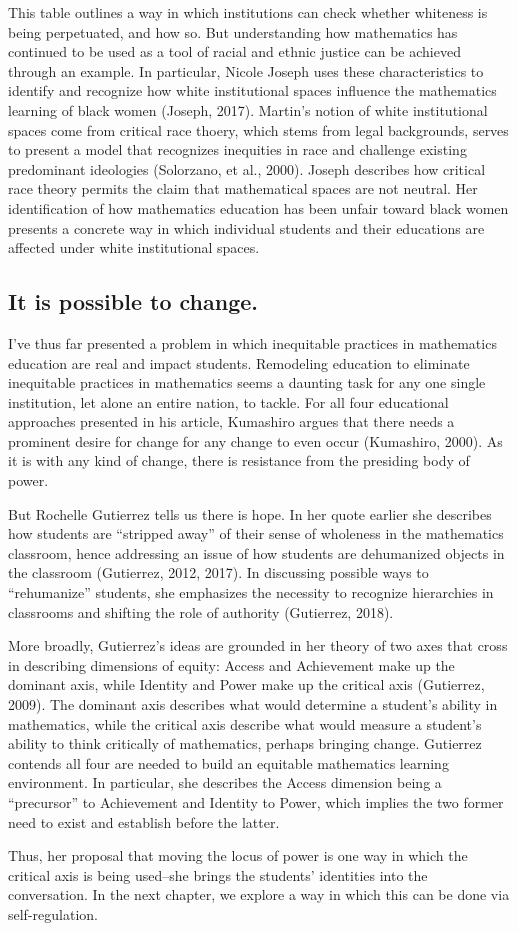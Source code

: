 This table outlines a way in which institutions can check whether whiteness is being perpetuated, and how so. But understanding how mathematics has continued to be used as a tool of racial and ethnic justice can be achieved through an example. In particular, Nicole Joseph uses these characteristics to identify and recognize how white institutional spaces influence the mathematics learning of black women (Joseph, 2017). Martin's notion of white institutional spaces come from critical race thoery, which stems from legal backgrounds, serves to present a model that recognizes inequities in race and challenge existing predominant ideologies (Solorzano, et al., 2000). Joseph describes how critical race theory permits the claim that mathematical spaces are not neutral. Her identification of how mathematics education has been unfair toward black women presents a concrete way in which individual students and their educations are affected under white institutional spaces.

\subsection{It is possible to change.}
I've thus far presented a problem in which inequitable practices in mathematics education are real and impact students. Remodeling education to eliminate inequitable practices in mathematics seems a daunting task for any one single institution, let alone an entire nation, to tackle. For all four educational approaches presented in his article, Kumashiro argues that there needs a prominent desire for change for any change to even occur (Kumashiro, 2000). As it is with any kind of change, there is resistance from the presiding body of power.

But Rochelle Gutierrez tells us there is hope. In her quote earlier she describes how students are ``stripped away'' of their sense of wholeness in the mathematics classroom, hence addressing an issue of how students are dehumanized objects in the classroom (Gutierrez, 2012, 2017). In discussing possible ways to ``rehumanize'' students, she emphasizes the necessity to recognize hierarchies in classrooms and shifting the role of authority (Gutierrez, 2018).

More broadly, Gutierrez's ideas are grounded in her theory of two axes that cross in describing dimensions of equity: Access and Achievement make up the dominant axis, while Identity and Power make up the critical axis (Gutierrez, 2009). The dominant axis describes what would determine a student's ability in mathematics, while the critical axis describe what would measure a student's ability to think critically of mathematics, perhaps bringing change. Gutierrez contends all four are needed to build an equitable mathematics learning environment. In particular, she describes the Access dimension being a ``precursor'' to Achievement and Identity to Power, which implies the two former need to exist and establish before the latter.

Thus, her proposal that moving the locus of power is one way in which the critical axis is being used--she brings the students' identities into the conversation. In the next chapter, we explore a way in which this can be done via self-regulation.
